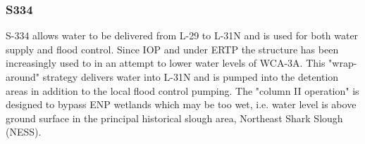 %
%


\clearpage


\subsubsection{S334}
S-334 allows water to be delivered from L-29 to L-31N and is used for both water supply and flood control.
Since IOP and under ERTP the structure has been increasingly used to in an attempt to lower water levels of WCA-3A.
This "wrap-around" strategy delivers water into L-31N and is pumped into the detention areas in addition to the local flood control pumping.
The "column II operation" is designed to bypass ENP wetlands which may be too wet, i.e. water level is above ground surface in the principal historical slough area, Northeast Shark Slough (NESS).

